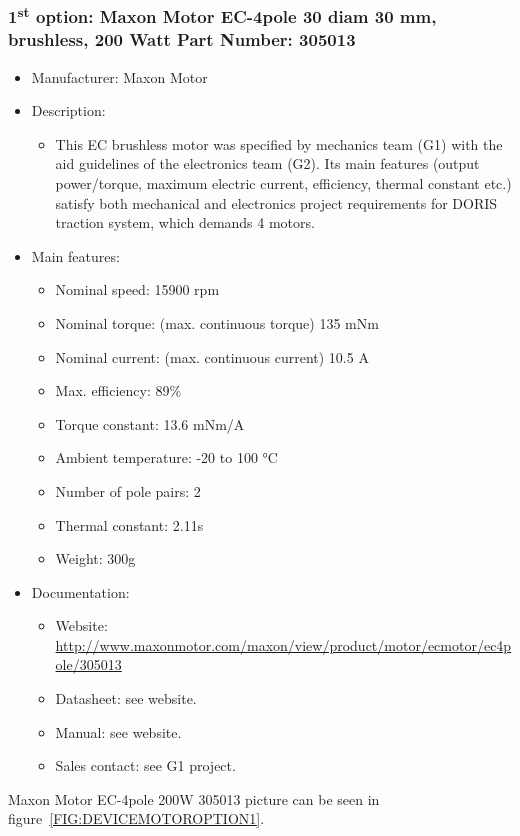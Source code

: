 \subsubsection{1\textsuperscript{st} option: Maxon Motor EC-4pole 30 diam 30 mm, brushless, 200 Watt Part Number: 305013} \label{DEVICE:MOTOR1}
\begin{itemize}
  \item Manufacturer: Maxon Motor
  \item Description:
  \begin{itemize}
    \item This EC brushless motor was specified by mechanics team (G1) with the aid guidelines of the electronics team (G2). Its main features (output power/torque, maximum electric current, efficiency, thermal constant etc.) satisfy both mechanical and electronics project requirements for DORIS traction system, which demands 4 motors.
  \end{itemize}
  \item Main features:
  \begin{itemize}
    \item Nominal speed: 15900 rpm
    \item Nominal torque: (max. continuous torque) 135 mNm
    \item Nominal current: (max. continuous current) 10.5 A
    \item Max. efficiency: 89\%
    \item Torque constant: 13.6 mNm/A
    \item Ambient temperature: -20 to 100 °C
    \item Number of pole pairs:	2
    \item Thermal constant: 2.11s
    \item Weight: 300g
  \end{itemize}
  \item Documentation:
  \begin{itemize}
    \item Website: \href{http://www.maxonmotor.com/maxon/view/product/motor/ecmotor/ec4pole/305013}{http://www.maxonmotor.com/maxon/view/product/motor/ecmotor/ec4pole/305013}
    \item Datasheet: see website.
    \item Manual: see website.
    \item Sales contact: see G1 project.
  \end{itemize}
\end{itemize}
Maxon Motor EC-4pole 200W 305013 picture can be seen in figure~\ref{FIG:DEVICEMOTOROPTION1}.
